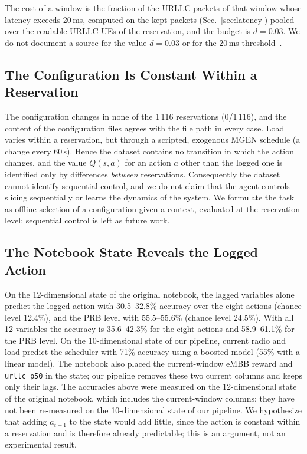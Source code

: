 The cost of a window is the fraction of the URLLC packets of that window whose latency exceeds 20\,ms, computed on the kept packets (Sec.~\ref{sec:latency}) pooled over the readable URLLC UEs of the reservation, and the budget is $d=0.03$.%
We do not document a source for the value $d=0.03$ or for the 20\,ms threshold~\cite{TODO-budget-latency-source}.%

\subsection{The Configuration Is Constant Within a Reservation}
\label{sec:config_constant}

The configuration changes in none of the 1\,116 reservations (0/1\,116), and the content of the configuration files agrees with the file path in every case.%
Load varies within a reservation, but through a scripted, exogenous MGEN schedule (a change every 60\,s).%
Hence the dataset contains no transition in which the action changes, and the value $Q(s,a)$ for an action $a$ other than the logged one is identified only by differences \emph{between} reservations.%
Consequently the dataset cannot identify sequential control, and we do not claim that the agent controls slicing sequentially or learns the dynamics of the system.%
We formulate the task as offline selection of a configuration given a context, evaluated at the reservation level; sequential control is left as future work.%

\subsection{The Notebook State Reveals the Logged Action}
\label{sec:leakage}

On the 12-dimensional state of the original notebook, the lagged variables alone predict the logged action with 30.5--32.8\% accuracy over the eight actions (chance level 12.4\%), and the PRB level with 55.5--55.6\% (chance level 24.5\%).%
With all 12 variables the accuracy is 35.6--42.3\% for the eight actions and 58.9--61.1\% for the PRB level.%
On the 10-dimensional state of our pipeline, current radio and load predict the scheduler with 71\% accuracy using a boosted model (55\% with a linear model).%
The notebook also placed the current-window eMBB reward and \texttt{urllc\_p50} in the state; our pipeline removes these two current columns and keeps only their lags.%
The accuracies above were measured on the 12-dimensional state of the original notebook, which includes the current-window columns; they have not been re-measured on the 10-dimensional state of our pipeline.%
We hypothesize that adding $a_{t-1}$ to the state would add little, since the action is constant within a reservation and is therefore already predictable; this is an argument, not an experimental result.%

